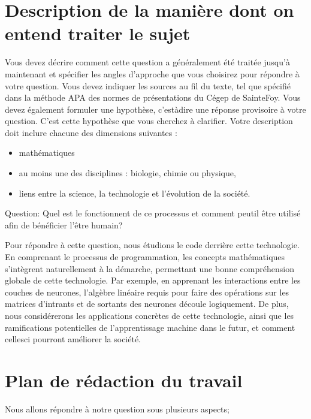 \documentclass[letterpaper,10pt,french]{sphinxmanual}
\begin{document}
\section{Description de la manière dont on entend traiter le sujet}
\label{\detokenize{description:description-de-la-maniere-dont-on-entend-traiter-le-sujet}}\label{\detokenize{description::doc}}
Vous devez décrire comment cette question a généralement été traitée jusqu’à
maintenant et spécifier les angles d’approche que vous choisirez pour répondre
à votre question. Vous devez indiquer les sources au
fil du texte, tel que spécifié dans la méthode APA des normes de présentations
du Cégep de Sainte\sphinxhyphen{}Foy. Vous devez également formuler une hypothèse, c’est\sphinxhyphen{}à\sphinxhyphen{}dire
une réponse provisoire à votre question. C’est
cette hypothèse que vous cherchez à clarifier.
Votre description doit inclure chacune des dimensions suivantes :
\begin{itemize}
\item {} 
mathématiques

\item {} 
au moins une des disciplines : biologie, chimie ou physique,

\item {} 
liens entre la science, la technologie et l’évolution de la société.

\end{itemize}

Question: Quel est le fonctionnent de ce processus et comment peut\sphinxhyphen{}il être
utilisé afin de bénéficier l’être humain?

Pour répondre à cette question, nous étudions le code derrière cette technologie.
En comprenant le processus de programmation, les concepts mathématiques s’intègrent
naturellement à la démarche, permettant une bonne compréhension globale de
cette technologie. Par exemple, en apprenant les interactions entre les couches
de neurones, l’algèbre linéaire requis pour faire des opérations sur les matrices
d’intrants et de sortants des neurones découle logiquement. De plus,
nous considérerons les applications concrètes de cette technologie, ainsi que les
ramifications potentielles de l’apprentissage machine dans le futur, et comment
celles\sphinxhyphen{}ci pourront améliorer la société.


\section{Plan de rédaction du travail}
\label{\detokenize{plan:plan-de-redaction-du-travail}}\label{\detokenize{plan::doc}}
Nous allons répondre à notre question sous plusieurs aspects;
\end{document}

